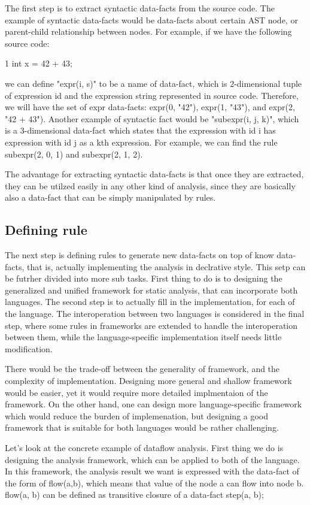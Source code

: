 The first step is to extract syntactic data-facts from the source code.
The example of syntactic data-facts would be data-facts about certain
AST node, or parent-child relationship between nodes. For example, if we
have the following source code:

1 int x = 42 + 43;

we can define "expr(i, s)" to be a name of data-fact, which is 2-dimensional
tuple of expression id and the expression string represented in source code.
Therefore, we will have the set of expr data-facts: expr(0, "42"), expr(1,
"43"), and expr(2, "42 + 43").  Another example of syntactic fact would be
"subexpr(i, j, k)", which is a 3-dimensional data-fact which states that the
expression with id i has expression with id j as a kth expression. For example,
we can find the rule subexpr(2, 0, 1) and subexpr(2, 1, 2).

The advantage for extracting syntactic data-facts is that once they are extracted,
they can be utilzed easily in any other kind of analysis, since they are basically
also a data-fact that can be simply manipulated by rules.

\subsection{Defining rule}

The next step is defining rules to generate new data-facts on top of know
data-facts, that is, actually implementing the analysis in declrative style.
This setp can be futrher divided into more sub tasks. First thing to do is to
designing the generalized and unified framework for static analysis,
that can incorporate both languages. The second step is to actually fill in
the implementation, for each of the language. The interoperation between two languages
is considered in the final step, where some rules in frameworks are extended
to handle the interoperation between them, while the language-specific implementation itself
needs little modification.

There would be the trade-off between the generality of framework, and the
complexity of implementation. Designing more general and shallow framework
would be easier, yet it would require more detailed implmentaion of the framework. On the other
hand, one can design more language-specific framework which would reduce the
burden of implemenation, but designing a good framework that is suitable for both
languages would be rather challenging.

Let's look at the concrete example of dataflow analysis. First thing we do is
designing the analysis framework, which can be applied to both of the language.
In this framework, the analysis result we want is expressed with the data-fact
of the form of flow(a,b), which means that value of the node a can flow into
node b. flow(a, b) can be defined as transitive closure of a data-fact step(a,
b);


